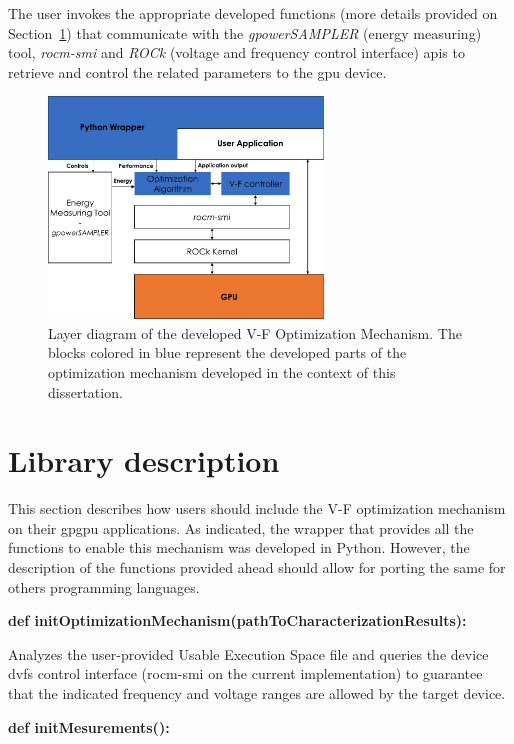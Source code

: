 The user invokes the appropriate developed functions (more details provided on Section~\ref{sec:usage}) that communicate with the \textit{gpowerSAMPLER} (energy measuring) tool, \textit{rocm-smi} and \textit{ROCk} (voltage and frequency control interface) \acrshort{api}s to retrieve and control the related parameters to the \acrshort{gpu} device. 

\begin{figure}[htb]
  \centering
  \includegraphics[width=0.65\textwidth]{Figures/Optimization/layerDiagram.pdf}
  \caption{Layer diagram of the developed V-F Optimization Mechanism. The blocks colored in blue represent the developed parts of the optimization mechanism developed in the context of this dissertation.}
  \label{fig:layer}
\end{figure}


\section{Library description}
\label{sec:usage}

This section describes how users should include the V-F optimization mechanism on their \acrshort{gpgpu} applications. As indicated, the wrapper that provides all the functions to enable this mechanism was developed in Python. However, the description of the functions provided ahead should allow for porting the same for others programming languages.

\textbf{def initOptimizationMechanism(pathToCharacterizationResults):}

Analyzes the user-provided Usable Execution Space file and queries the device \acrshort{dvfs} control interface (rocm-smi on the current implementation) to guarantee that the indicated frequency and voltage ranges are allowed by the target device.

\textbf{def initMesurements():}

